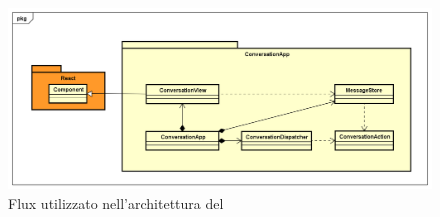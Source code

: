     \begin{figure}[h]
	\centering
	\includegraphics[width=\textwidth,height=\textheight,keepaspectratio,scale=0.1]{images/diagrams/client/Client/Flux.png}
	\caption{Flux utilizzato nell'architettura del  \PROGETTO}\label{fig:flux2}
\end{figure}
    \newpage

    \newpage
